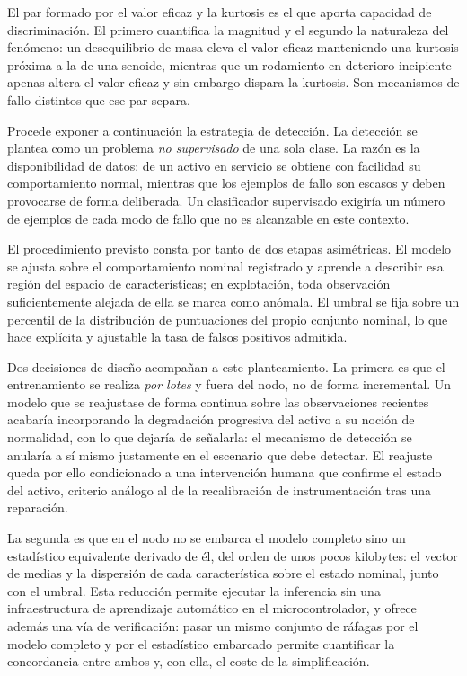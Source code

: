 El par formado por el valor eficaz y la kurtosis es el que aporta capacidad de
discriminación. El primero cuantifica la magnitud y el segundo la naturaleza del fenómeno:
un desequilibrio de masa eleva el valor eficaz manteniendo una kurtosis próxima a la de una
senoide, mientras que un rodamiento en deterioro incipiente apenas altera el valor eficaz y
sin embargo dispara la kurtosis. Son mecanismos de fallo distintos que ese par separa.

Procede exponer a continuación la estrategia de detección. La detección se plantea como un problema \textit{no supervisado} de una sola clase. La razón
es la disponibilidad de datos: de un activo en servicio se obtiene con facilidad su
comportamiento normal, mientras que los ejemplos de fallo son escasos y deben provocarse de
forma deliberada. Un clasificador supervisado exigiría un número de ejemplos de cada modo de
fallo que no es alcanzable en este contexto.

El procedimiento previsto consta por tanto de dos etapas asimétricas. El modelo se ajusta
sobre el comportamiento nominal registrado y aprende a describir esa región del espacio de
características; en explotación, toda observación suficientemente alejada de ella se marca
como anómala. El umbral se fija sobre un percentil de la distribución de puntuaciones del
propio conjunto nominal, lo que hace explícita y ajustable la tasa de falsos positivos
admitida.

Dos decisiones de diseño acompañan a este planteamiento. La primera es que el entrenamiento
se realiza \textit{por lotes} y fuera del nodo, no de forma incremental. Un modelo que se
reajustase de forma continua sobre las observaciones recientes acabaría incorporando la
degradación progresiva del activo a su noción de normalidad, con lo que dejaría de señalarla:
el mecanismo de detección se anularía a sí mismo justamente en el escenario que debe
detectar. El reajuste queda por ello condicionado a una intervención humana que confirme el
estado del activo, criterio análogo al de la recalibración de instrumentación tras una
reparación.

La segunda es que en el nodo no se embarca el modelo completo sino un estadístico equivalente
derivado de él, del orden de unos pocos kilobytes: el vector de medias y la dispersión de
cada característica sobre el estado nominal, junto con el umbral. Esta reducción permite
ejecutar la inferencia sin una infraestructura de aprendizaje automático en el
microcontrolador, y ofrece además una vía de verificación: pasar un mismo conjunto de
ráfagas por el modelo completo y por el estadístico embarcado permite cuantificar la
concordancia entre ambos y, con ella, el coste de la simplificación.

